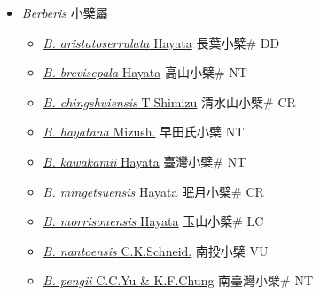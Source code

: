 
  \begin{itemize}
 \item[] \textit{Berberis} 小檗屬
                    
  \begin{itemize}
        \item[] \href{http://www.theplantlist.org/tpl1.1/search?q=Berberis+aristatoserrulata}{\textit{B. aristatoserrulata} Hayata}   長葉小檗\# DD
        \item[] \href{http://www.theplantlist.org/tpl1.1/search?q=Berberis+brevisepala}{\textit{B. brevisepala} Hayata}   高山小檗\# NT
        \item[] \href{http://www.theplantlist.org/tpl1.1/search?q=Berberis+chingshuiensis}{\textit{B. chingshuiensis} T.Shimizu}   清水山小檗\# CR
        \item[] \href{http://www.theplantlist.org/tpl1.1/search?q=Berberis+hayatana}{\textit{B. hayatana} Mizush.}   早田氏小檗 NT
        \item[] \href{http://www.theplantlist.org/tpl1.1/search?q=Berberis+kawakamii}{\textit{B. kawakamii} Hayata}   臺灣小檗\# NT
        \item[] \href{http://www.theplantlist.org/tpl1.1/search?q=Berberis+mingetsuensis}{\textit{B. mingetsuensis} Hayata}   眠月小檗\# CR
        \item[] \href{http://www.theplantlist.org/tpl1.1/search?q=Berberis+morrisonensis}{\textit{B. morrisonensis} Hayata}   玉山小檗\# LC
        \item[] \href{http://www.theplantlist.org/tpl1.1/search?q=Berberis+nantoensis}{\textit{B. nantoensis} C.K.Schneid.}   南投小檗 VU
        \item[] \href{http://www.theplantlist.org/tpl1.1/search?q=Berberis+pengii}{\textit{B. pengii} C.C.Yu \& K.F.Chung}   南臺灣小檗\# NT

\end{itemize}
\end{itemize}
